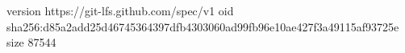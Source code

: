 version https://git-lfs.github.com/spec/v1
oid sha256:d85a2add25d46745364397dfb4303060ad99fb96e10ae427f3a49115af93725e
size 87544
